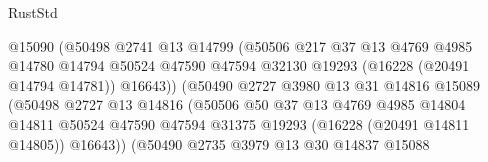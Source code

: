 \begin{lexlean}{RustStd}
\begin{coremodule}
                                      @15090
                                      (@50498
                                        @2741
                                        @13
                                        @14799
                                        (@50506
                                          @217
                                          @37
                                          @13
                                          @4769
                                          @4985
                                          @14780
                                          @14794
                                          @50524
                                          @47590
                                          @47594
                                          @32130
                                          @19293
                                          (@16228 (@20491 @14794 @14781))
                                          @16643))
                                      (@50490
                                        @2727
                                        @3980
                                        @13
                                        @31
                                        @14816
                                        @15089
                                        (@50498
                                          @2727
                                          @13
                                          @14816
                                          (@50506
                                            @50
                                            @37
                                            @13
                                            @4769
                                            @4985
                                            @14804
                                            @14811
                                            @50524
                                            @47590
                                            @47594
                                            @31375
                                            @19293
                                            (@16228 (@20491 @14811 @14805))
                                            @16643))
                                        (@50490
                                          @2735
                                          @3979
                                          @13
                                          @30
                                          @14837
                                          @15088

\end{coremodule}
\end{lexlean}
